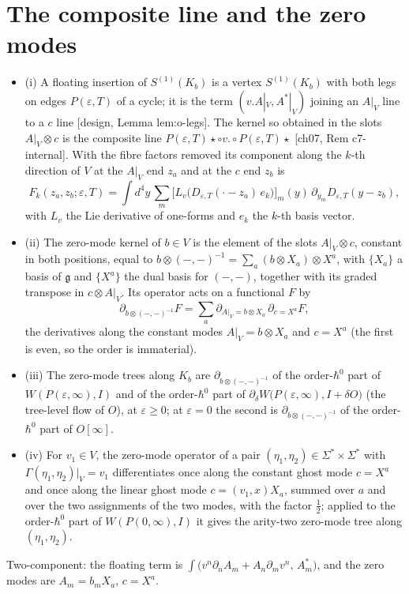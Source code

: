 \section{The composite line and the zero modes}

\begin{definition}
\label{def:ktr-composite}
\begin{itemize}
\item (i) A floating insertion of $S^{(1)}(K_b)$ is a vertex $S^{(1)}(K_b)$ with both legs on edges $P(\varepsilon,T)$ of a cycle; it is the term $(v.A|_V,A^*|_V)$ joining an $A|_V$ line to a $c$ line [design, Lemma lem:o-legs]. The kernel so obtained in the slots $A|_V\otimes c$ is the composite line $P(\varepsilon,T)\star\circ v.\circ P(\varepsilon,T)\star$ [ch07, Rem c7-internal]. With the fibre factors removed its component along the $k$-th direction of $V$ at the $A|_V$ end $z_a$ and at the $c$ end $z_b$ is
\[
F_k(z_a,z_b;\varepsilon,T)=\int d^4y\,\sum_m\big[L_v\big(D_{\varepsilon,T}(\cdot-z_a)\,e_k\big)\big]_m(y)\,\partial_{y_m}D_{\varepsilon,T}(y-z_b),
\]
with $L_v$ the Lie derivative of one-forms and $e_k$ the $k$-th basis vector.
\item (ii) The zero-mode kernel of $b\in V$ is the element of the slots $A|_V\otimes c$, constant in both positions, equal to $b\otimes(-,-)^{-1}=\sum_a(b\otimes X_a)\otimes X^a$, with $\{X_a\}$ a basis of $\mathfrak g$ and $\{X^a\}$ the dual basis for $(-,-)$, together with its graded transpose in $c\otimes A|_V$. Its operator acts on a functional $F$ by
\[
\partial_{b\otimes(-,-)^{-1}}F=\sum_a\partial_{A|_V=b\otimes X_a}\,\partial_{c=X^a}F ,
\]
the derivatives along the constant modes $A|_V=b\otimes X_a$ and $c=X^a$ (the first is even, so the order is immaterial).
\item (iii) The zero-mode trees along $K_b$ are $\partial_{b\otimes(-,-)^{-1}}$ of the order-$\hbar^0$ part of $W(P(\varepsilon,\infty),I)$ and of the order-$\hbar^0$ part of $\partial_\delta W\big(P(\varepsilon,\infty),I+\delta O\big)$ (the tree-level flow of $O$), at $\varepsilon\ge0$; at $\varepsilon=0$ the second is $\partial_{b\otimes(-,-)^{-1}}$ of the order-$\hbar^0$ part of $O[\infty]$.
\item (iv) For $v_1\in V$, the zero-mode operator of a pair $(\eta_1,\eta_2)\in\Sigma^*\times\Sigma^*$ with $\Gamma(\eta_1,\eta_2)|_V=v_1$ differentiates once along the constant ghost mode $c=X^a$ and once along the linear ghost mode $c=(v_1,x)X_a$, summed over $a$ and over the two assignments of the two modes, with the factor $\tfrac12$; applied to the order-$\hbar^0$ part of $W(P(0,\infty),I)$ it gives the arity-two zero-mode tree along $(\eta_1,\eta_2)$.
\end{itemize}
Two-component: the floating term is $\int\big(v^n\partial_nA_m+A_n\partial_mv^n,\,A^*_m\big)$, and the zero modes are $A_m=b_mX_a$, $c=X^a$.
\end{definition}

